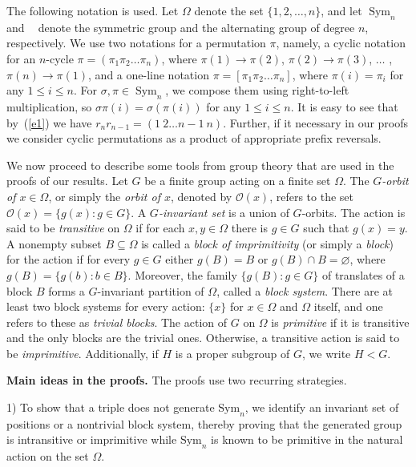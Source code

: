 \documentclass[
final
]{dmtcs-episciences}
\DeclareMathOperator{\Sym}{\mathrm{Sym}}
\DeclareMathOperator{\Alt}{\mathrm{Alt}_n}
\begin{document}
The following notation is used. Let $\Omega$ denote the set $\{1,2,\ldots,n\}$, and let $\Sym_n$ and $\Alt$ denote the symmetric group and the alternating group of degree $n$, respectively. We use two notations for a permutation $\pi$, namely, a cyclic notation for an $n$-cycle $\pi=(\pi_1\pi_2\ldots\pi_n)$, where $\pi(1) \rightarrow  \pi(2)$, $\pi(2) \rightarrow  \pi(3)$, $\ldots$ , $\pi(n) \rightarrow  \pi(1)$, and a one-line notation $\pi=[\pi_1\pi_2\ldots\pi_n]$, where $\pi(i)=\pi_i$ for any $1\leqslant i\leqslant n$. For $\sigma,\pi\in\Sym_n$, we compose them using right-to-left multiplication, so $\sigma\pi(i)=\sigma(\pi(i))$ for any  $1\leqslant i\leqslant n$. It is easy to see that by~(\ref{e1}) we have $r_{n}r_{n-1}=(1\ 2 \ldots n-1\ n)$. Further, if it necessary in our proofs we consider cyclic permutations as a product of appropriate prefix reversals.

We now proceed to describe some  tools from group theory that are used in the proofs of our results. Let $G$ be a finite group acting on a finite set $\Omega$. The \textit{$G$-orbit of $x\in\Omega$}, or simply the \textit{orbit of $x$}, denoted by $\mathcal{O}(x)$, refers to the set $\mathcal{O}(x)=\{g(x) : g \in G\}$. A \textit{$G$-invariant set} is a union of $G$-orbits. The action is said to be {\it transitive} on $\Omega$ if for each $x, y \in \Omega$ there is $g\in G$ such that $g(x)=y$. A nonempty subset $B\subseteq \Omega$ is called a \emph{block of imprimitivity} (or simply a \emph{block}) for the action if for every $g\in G$ either $g(B) = B$ or $g(B)\cap B=\varnothing$, where $g(B)=\{g(b):b\in B\}$. Moreover, the family $\{g(B) : g\in G\}$ of translates of a block $B$ forms a $G$-invariant partition of $\Omega$, called a \emph{block system}. There are at least two block systems for every action: $\{x\}$ for $x\in \Omega$  and $\Omega$ itself, and one refers to these as \emph{trivial blocks}. The action of $G$ on $\Omega$ is \emph{primitive} if it is transitive and the only blocks are the trivial ones. Otherwise, a transitive action is said to be \emph{imprimitive}. Additionally, if $H$ is a proper subgroup of $G$, we write $H<G$.


{\bf Main ideas in the proofs.} The proofs use two recurring strategies. 

1) To show that a triple does not generate $\mathrm{Sym}_n$, we identify an invariant set of positions or a nontrivial block system, thereby proving that the generated group is intransitive or imprimitive while $\mathrm{Sym}_n$ is known to be primitive in the natural action on the set $\Omega$.
\end{document}

